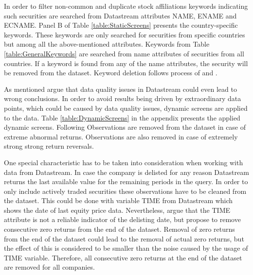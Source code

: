 \documentclass[12pt]{article}
\begin{document}
In order to filter non-common and duplicate stock affiliations keywords indicating such securities are searched from Datastream attributes NAME, ENAME and ECNAME. Panel B of Table \ref{table:StaticScreens} presents the country-specific keywords. These keywords are only searched for securities from specific countries but among all the above-mentioned attributes. Keywords from Table \ref{table:GeneralKeywords} are searched from name attributes of securities from all countries. If a keyword is found from any of the name attributes, the security will be removed from the dataset. Keyword deletion follows process of \citet{Ince2006} and \citet{HANAUER2023106712}.\footnotemark {} \par

As mentioned \citet{Ince2006} argue that data quality issues in Datastream could even lead to wrong conclusions.\footnotemark {} In order to avoid results being driven by extraordinary data points, which could be caused by data quality issues, dynamic screens are applied to the data. Table \ref{table:DynamicScreens} in the appendix presents the applied dynamic screens. Following \citet{HANAUER2023106712} Observations are removed from the dataset in case of extreme abnormal returns. Observations are also removed in case of extremely strong strong return reversals.\footnotemark {}\par

One special characteristic has to be taken into consideration when working with data from Datastream. In case the company is delisted for any reason Datastream returns the last available value for the remaining periods in the query. In order to only include actively traded securities these observations have to be cleaned from the dataset. This could be done with variable TIME from Datastream which shows the date of last equity price data. Nevertheless, \citet{Ince2006} argue that the TIME attribute is not a reliable indicator of the delisting date, but propose to remove consecutive zero returns from the end of the dataset. Removal of zero returns from the end of the dataset could lead to the removal of actual zero returns, but the effect of this is considered to be smaller than the noise caused by the usage of TIME variable.\footnotemark {} Therefore, all consecutive zero returns at the end of the dataset are removed for all companies. \par
\end{document}
